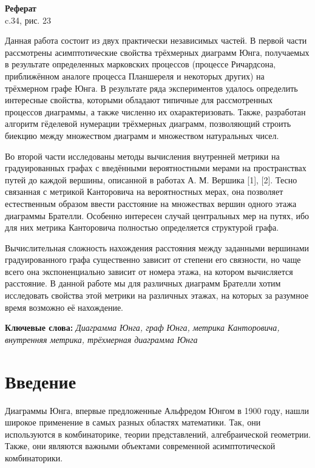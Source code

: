 \documentclass[12pt]{report}
\begin{document}
\small\tableofcontents\pagebreak\normalsize

\begin{center}
\huge{\textbf{Реферат}}\\
\vspace{0.5cm}
\normalsize c.34, рис. 23
\end{center}

Данная работа состоит из двух практически независимых частей. 
В первой части рассмотрены асимптотические свойства трёхмерных диаграмм Юнга, получаемых в результате определенных марковских процессов (процессе Ричардсона, приближённом аналоге процесса Планшереля и некоторых других) на трёхмерном графе Юнга. В результате ряда экспериментов удалось определить интересные свойства, которыми обладают типичные для рассмотренных процессов диаграммы, а также численно их охарактеризовать. Также, разработан алгоритм гёделевой нумерации трёхмерных диаграмм, позволяющий строить биекцию между множеством диаграмм и множеством натуральных чисел. 

Во второй части исследованы методы вычисления внутренней метрики на градуированных графах с введёнными вероятностными мерами на пространствах путей до каждой вершины, описанной в работах А. М. Вершика [1], [2]. Тесно связанная с метрикой Канторовича на вероятностных мерах, она позволяет естественным образом ввести расстояние на множествах вершин одного этажа диаграммы Брателли. Особенно интересен случай центральных мер на путях, ибо для них метрика Канторовича полностью определяется структурой графа. 

Вычислительная сложность нахождения расстояния между заданными вершинами градуированного графа существенно зависит от степени его связности, но чаще всего она экспоненциально зависит от номера этажа, на котором вычисляется расстояние. В данной работе мы для различных диаграмм Брателли хотим исследовать свойства этой метрики на различных этажах, на которых за разумное время возможно её нахождение.

\vspace{1cm}
\textbf{Ключевые слова:} \textit {Диаграмма Юнга, граф Юнга, метрика Канторовича, внутренняя метрика, трёхмерная диаграмма Юнга}

\newpage
\chapter{Введение}
\hspace{\parindent} Диаграммы Юнга, впервые предложенные Альфредом Юнгом в 1900 году, нашли широкое применение в самых разных областях математики. Так, они используются в комбинаторике, теории представлений, алгебраической геометрии. Также, они являются важными объектами современной асимптотической комбинаторики. 
\end{document}
